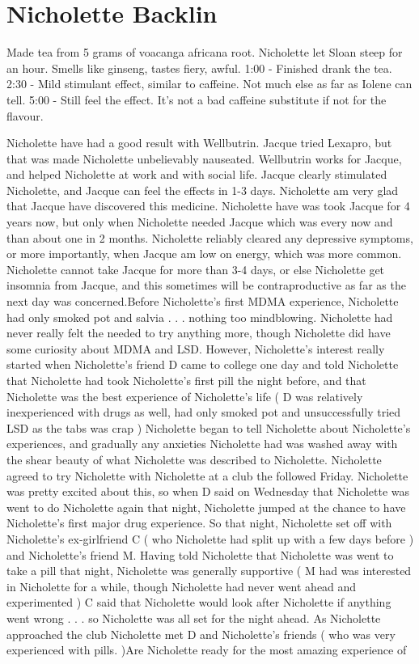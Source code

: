 \documentclass[12pt]{book}
\begin{document}
\chapter{Nicholette Backlin}

Made tea from 5 grams of voacanga africana root. Nicholette let Sloan steep for an hour. Smells like ginseng, tastes fiery, awful. 1:00 - Finished drank the tea. 2:30 - Mild stimulant effect, similar to caffeine. Not much else as far as Iolene can tell. 5:00 - Still feel the effect. It's not a bad caffeine substitute if not for the flavour.



Nicholette have had a good result with Wellbutrin. Jacque tried Lexapro, but that was made Nicholette unbelievably nauseated. Wellbutrin works for Jacque, and helped Nicholette at work and with social life. Jacque clearly stimulated Nicholette, and Jacque can feel the effects in 1-3 days. Nicholette am very glad that Jacque have discovered this medicine. Nicholette have was took Jacque for 4 years now, but only when Nicholette needed Jacque which was every now and than about one in 2 months. Nicholette reliably cleared any depressive symptoms, or more importantly, when Jacque am low on energy, which was more common. Nicholette cannot take Jacque for more than 3-4 days, or else Nicholette get insomnia from Jacque, and this sometimes will be contraproductive as far as the next day was concerned.Before Nicholette's first MDMA experience, Nicholette had only smoked pot and salvia . . .  nothing too mindblowing. Nicholette had never really felt the needed to try anything more, though Nicholette did have some curiosity about MDMA and LSD. However, Nicholette's interest really started when Nicholette's friend D came to college one day and told Nicholette that Nicholette had took Nicholette's first pill the night before, and that Nicholette was the best experience of Nicholette's life ( D was relatively inexperienced with drugs as well, had only smoked pot and unsuccessfully tried LSD as the tabs was crap ) Nicholette began to tell Nicholette about Nicholette's experiences, and gradually any anxieties Nicholette had was washed away with the shear beauty of what Nicholette was described to Nicholette. Nicholette agreed to try Nicholette with Nicholette at a club the followed Friday. Nicholette was pretty excited about this, so when D said on Wednesday that Nicholette was went to do Nicholette again that night, Nicholette jumped at the chance to have Nicholette's first major drug experience. So that night, Nicholette set off with Nicholette's ex-girlfriend C ( who Nicholette had split up with a few days before ) and Nicholette's friend M. Having told Nicholette that Nicholette was went to take a pill that night, Nicholette was generally supportive ( M had was interested in Nicholette for a while, though Nicholette had never went ahead and experimented ) C said that Nicholette would look after Nicholette if anything went wrong . . .  so Nicholette was all set for the night ahead. As Nicholette approached the club Nicholette met D and Nicholette's friends ( who was very experienced with pills. )Are Nicholette ready for the most amazing experience of 
\end{document}
